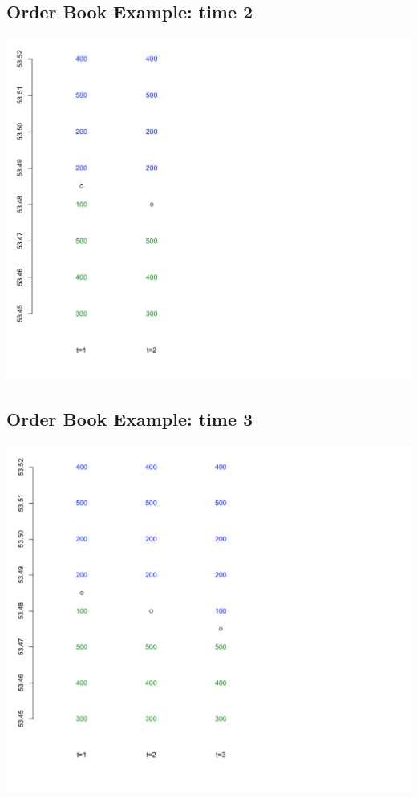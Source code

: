 \documentclass[letterpaper,10pt,english]{sphinxmanual}
\begin{document}
\subsection{Order Book Example: time 2}
\label{trading:order-book-example-time-2}
\includegraphics[width=6in]{orderBook2.png}


\subsection{Order Book Example: time 3}
\label{trading:order-book-example-time-3}
\includegraphics[width=6in]{orderBook3.png}
\end{document}
